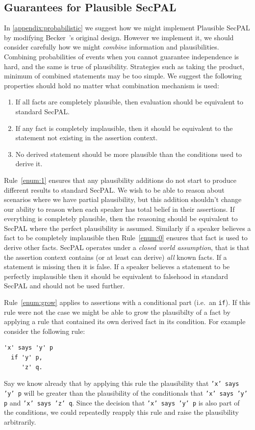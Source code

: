 \documentclass[thesis.tex]{subfiles}
\begin{document}
\subsection{Guarantees for Plausible SecPAL} 

In \autoref{appendix:probabilistic} we suggest how we might implement Plausible
SecPAL by modifying Becker~\etal's original design. However we implement it, we
should consider carefully how we might \emph{combine} information and
plausibilities. Combining probabilities of events when you cannot guarantee
independence is hard, and the same is true of plausibility. Strategies such as
taking the product, minimum of combined statements may be too simple. We suggest
the following properties should hold no matter what combination mechanism is
used:

\begin{enumerate}
\item \label{enum:1} If all facts are completely plausible, then evaluation should be
  equivalent to standard SecPAL.
\item \label{enum:0} If any fact is completely  implausible, then it should be equivalent
  to the statement not existing in the assertion context.
\item \label{enum:grow} No derived statement should be more plausible than the conditions used
  to derive it.
\end{enumerate}

Rule~\ref{enum:1} ensures that any plausibility additions do not start to
produce different results to standard SecPAL. We wish to be able to reason about
scenarios where we have partial plausibility, but this addition shouldn't change
our ability to reason when each speaker has total belief in their assertions. If
everything is completely plausible, then the reasoning should be equivalent to
SecPAL where the perfect plausibility is assumed. Similarly if a speaker
believes a fact to be completely implausible then Rule~\ref{enum:0} ensures that
fact is used to derive other facts. SecPAL operates under a \emph{closed world
assumption}, that is that the assertion context contains (or at least can
derive) \emph{all} known facts. If a statement is missing then it is false. If a
speaker believes a statement to be perfectly implausible then it should be
equivalent to falsehood in standard SecPAL and should not be used further.

Rule~\ref{enum:grow} applies to assertions with a conditional part (i.e.~an
\texttt{if}). If this rule were not the case we might be able to grow the
plausibilty of a fact by applying a rule that contained its own derived fact in
its condition. For example consider the following rule:
\begin{lstlisting}
'x' says 'y' p
  if 'y' p,
     'z' q.
\end{lstlisting} Say we know already that by applying this rule the plausibility
that \texttt{'x' says 'y' p} will be greater than the plausibility of the
conditionals that \texttt{'x' says 'y' p} and \texttt{'x' says 'z' q}. Since the
decision that \texttt{'x' says 'y' p} is also part of the conditions, we could
repeatedly reapply this rule and raise the plausibility arbitrarily.
\end{document}
